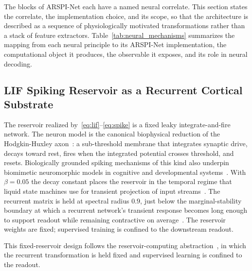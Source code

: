 \documentclass[journal]{IEEEtran}
\begin{document}
The blocks of ARSPI-Net each have a named neural correlate. This section states the correlate, the implementation choice, and its scope, so that the architecture is described as a sequence of physiologically motivated transformations rather than a stack of feature extractors. Table~\ref{tab:neural_mechanisms} summarizes the mapping from each neural principle to its ARSPI-Net implementation, the computational object it produces, the observable it exposes, and its role in neural decoding.



\subsection{LIF Spiking Reservoir as a Recurrent Cortical Substrate}
The reservoir realized by~\eqref{eq:lif}--\eqref{eq:spike} is a fixed leaky integrate-and-fire network. The neuron model is the canonical biophysical reduction of the Hodgkin-Huxley axon~\cite{hodgkin1952quantitative}: a sub-threshold membrane that integrates synaptic drive, decays toward rest, fires when the integrated potential crosses threshold, and resets. Biologically grounded spiking mechanisms of this kind also underpin biomimetic neuromorphic models in cognitive and developmental systems~\cite{kim2024biomimetic}. With $\beta=0.05$ the decay constant places the reservoir in the temporal regime that liquid state machines use for transient projection of input streams~\cite{maass2002liquid}. The recurrent matrix is held at spectral radius $0.9$, just below the marginal-stability boundary at which a recurrent network's transient response becomes long enough to support readout while remaining contractive on average~\cite{jaeger2001echo,sussillo2009generating}. The reservoir weights are fixed; supervised training is confined to the downstream readout.

This fixed-reservoir design follows the reservoir-computing abstraction~\cite{lukosevicius2009reservoir}, in which the recurrent transformation is held fixed and supervised learning is confined to the readout.
\end{document}
